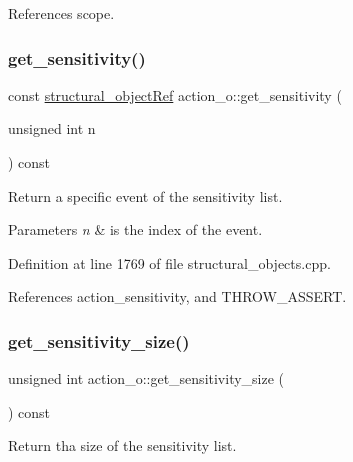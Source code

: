 References scope.

\mbox{\label{classaction__o_a52581f175528ab3ddc95b6cb2ec721b9}} 
\subsubsection{\texorpdfstring{get\+\_\+sensitivity()}{get\_sensitivity()}}
{\footnotesize\ttfamily const \hyperlink{structural__objects_8hpp_a8ea5f8cc50ab8f4c31e2751074ff60b2}{structural\+\_\+object\+Ref} action\+\_\+o\+::get\+\_\+sensitivity (\begin{DoxyParamCaption}\item[{unsigned int}]{n }\end{DoxyParamCaption}) const}



Return a specific event of the sensitivity list. 


\begin{DoxyParams}{Parameters}
{\em n} & is the index of the event. \\
\hline
\end{DoxyParams}


Definition at line 1769 of file structural\+\_\+objects.\+cpp.



References action\+\_\+sensitivity, and T\+H\+R\+O\+W\+\_\+\+A\+S\+S\+E\+RT.

\mbox{\label{classaction__o_ae18683928943e3f8fb38a609e8abc579}} 
\subsubsection{\texorpdfstring{get\+\_\+sensitivity\+\_\+size()}{get\_sensitivity\_size()}}
{\footnotesize\ttfamily unsigned int action\+\_\+o\+::get\+\_\+sensitivity\+\_\+size (\begin{DoxyParamCaption}{ }\end{DoxyParamCaption}) const}



Return tha size of the sensitivity list. 



